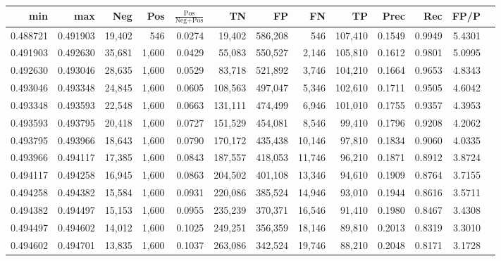 \begin{tabular}{rrrrrrrrrrrrr}
\toprule
     min &      max &    Neg &   Pos & $\frac{\text{Pos}}{\text{Neg}+\text{Pos}}$ &      TN &      FP &      FN &      TP &   Prec &    Rec &   FP/P \\
\midrule
0.488721 & 0.491903 & 19,402 &   546 &                                     0.0274 &  19,402 & 586,208 &     546 & 107,410 & 0.1549 & 0.9949 & 5.4301 \\
0.491903 & 0.492630 & 35,681 & 1,600 &                                     0.0429 &  55,083 & 550,527 &   2,146 & 105,810 & 0.1612 & 0.9801 & 5.0995 \\
0.492630 & 0.493046 & 28,635 & 1,600 &                                     0.0529 &  83,718 & 521,892 &   3,746 & 104,210 & 0.1664 & 0.9653 & 4.8343 \\
0.493046 & 0.493348 & 24,845 & 1,600 &                                     0.0605 & 108,563 & 497,047 &   5,346 & 102,610 & 0.1711 & 0.9505 & 4.6042 \\
0.493348 & 0.493593 & 22,548 & 1,600 &                                     0.0663 & 131,111 & 474,499 &   6,946 & 101,010 & 0.1755 & 0.9357 & 4.3953 \\
0.493593 & 0.493795 & 20,418 & 1,600 &                                     0.0727 & 151,529 & 454,081 &   8,546 &  99,410 & 0.1796 & 0.9208 & 4.2062 \\
0.493795 & 0.493966 & 18,643 & 1,600 &                                     0.0790 & 170,172 & 435,438 &  10,146 &  97,810 & 0.1834 & 0.9060 & 4.0335 \\
0.493966 & 0.494117 & 17,385 & 1,600 &                                     0.0843 & 187,557 & 418,053 &  11,746 &  96,210 & 0.1871 & 0.8912 & 3.8724 \\
0.494117 & 0.494258 & 16,945 & 1,600 &                                     0.0863 & 204,502 & 401,108 &  13,346 &  94,610 & 0.1909 & 0.8764 & 3.7155 \\
0.494258 & 0.494382 & 15,584 & 1,600 &                                     0.0931 & 220,086 & 385,524 &  14,946 &  93,010 & 0.1944 & 0.8616 & 3.5711 \\
0.494382 & 0.494497 & 15,153 & 1,600 &                                     0.0955 & 235,239 & 370,371 &  16,546 &  91,410 & 0.1980 & 0.8467 & 3.4308 \\
0.494497 & 0.494602 & 14,012 & 1,600 &                                     0.1025 & 249,251 & 356,359 &  18,146 &  89,810 & 0.2013 & 0.8319 & 3.3010 \\
0.494602 & 0.494701 & 13,835 & 1,600 &                                     0.1037 & 263,086 & 342,524 &  19,746 &  88,210 & 0.2048 & 0.8171 & 3.1728 \\

\end{tabular}
